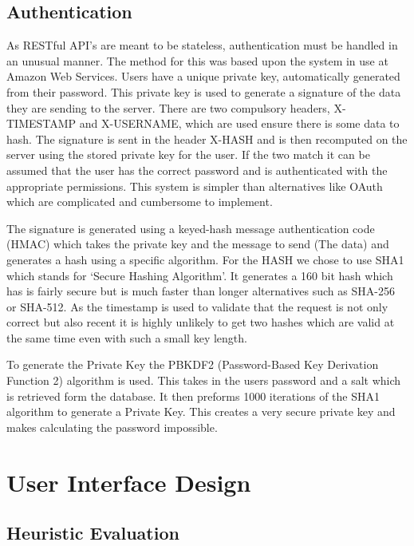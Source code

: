 \documentclass[11pt,a4paper]{article}
\begin{document}
\subsection{Authentication}

As RESTful API's are meant to be stateless, authentication must be handled in an unusual manner. The method for this was based upon the system in use at Amazon Web Services\cite{auth}. Users have a unique private key, automatically generated from their password. This private key is used to generate a signature of the data they are sending to the server. There are two compulsory headers, X-TIMESTAMP and X-USERNAME, which are used ensure there is some data to hash. The signature is sent in the header X-HASH and is then recomputed on the server using the stored private key for the user. If the two match it can be assumed that the user has the correct password and is authenticated with the appropriate permissions. This system is simpler than alternatives like OAuth which are complicated and cumbersome to implement.

The signature is generated using a keyed-hash message authentication code (HMAC) which takes the private key and the message to send (The data) and generates a hash using a specific algorithm. For the HASH we chose to use SHA1 which stands for `Secure Hashing Algorithm'. It generates a 160 bit hash which has is fairly secure but is much faster than longer alternatives such as SHA-256 or SHA-512. As the timestamp is used to validate that the request is not only correct but also recent it is highly unlikely to get two hashes which are valid at the same time even with such a small key length.

To generate the Private Key the PBKDF2 (Password-Based Key Derivation Function 2) algorithm is used. This takes in the users password and a salt which is retrieved form the database. It then preforms 1000 iterations of the SHA1 algorithm to generate a Private Key. This creates a very secure private key and makes calculating the password impossible.




\section{User Interface Design}


\subsection{Heuristic Evaluation}
\end{document}
